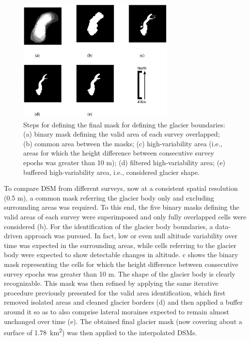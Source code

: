 \begin{figure}[ht]
    \centering
    \includegraphics[width=0.7\textwidth]{glacier_masks.png}
    \caption{Steps for defining the final mask for defining the glacier boundaries: (a) binary mask defining the valid area of each survey overlapped; (b) common area between the masks; (c) high-variability area (i.e., areas for which the height difference between consecutive survey epochs was greater than 10 m); (d) filtered high-variability area; (e) buffered high-variability area, i.e., considered glacier shape. }
    \label{fig:2:glacier_masks}
\end{figure}

To compare DSM from different surveys, now at a consistent spatial resolution (0.5 m), a common mask referring the glacier body only and excluding surrounding areas was required.
To this end, the five binary masks defining the valid areas of each survey were superimposed and only fully overlapped cells were considered (b).
For the identification of the glacier body boundaries, a data-driven approach was pursued. 
In fact, low or even null altitude variability over time was expected in the surrounding areas, while cells referring to the glacier body were expected to show detectable changes in altitude. 
c shows the binary mask representing the cells for which the height difference between consecutive survey epochs was greater than 10 m. 
The shape of the glacier body is clearly recognizable. 
This mask was then refined by applying the same iterative procedure previously presented for the valid area identification, which first removed isolated areas and cleaned glacier borders (d) and then applied a buffer around it so as to also comprise lateral moraines expected to remain almost unchanged over time (e). 
The obtained final glacier mask (now covering about a surface of \SI{1.78}{\kilo\meter\squared}) was then applied to the interpolated DSMs.

